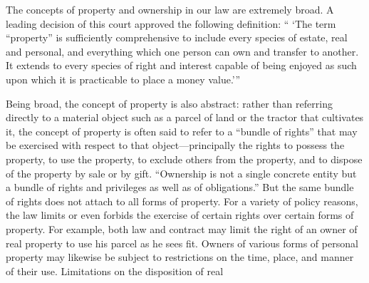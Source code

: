 The concepts of property and ownership in our law are extremely broad. A leading
decision of this court approved the following definition: `` `The term
``property'' is sufficiently comprehensive to include every species of estate,
real and personal, and everything which one person can own and transfer to
another. It extends to every species of right and interest capable of being
enjoyed as such upon which it is practicable to place a money value.'{}''

Being broad, the concept of property is also abstract: rather than referring
directly to a material object such as a parcel of land or the tractor that
cultivates it, the concept of property is often said to refer to a ``bundle of
rights'' that may be exercised with respect to that object---principally the
rights to possess the property, to use the property, to exclude others from the
property, and to dispose of the property by sale or by gift. ``Ownership is not
a single concrete entity but a bundle of rights and privileges as well as of
obligations.'' But the same bundle of rights does not attach to all forms of
property. For a variety of policy reasons, the law limits or even forbids the
exercise of certain rights over certain forms of property. For example, both
law and contract may limit the right of an owner of real property to use his
parcel as he sees fit. Owners of various forms of
personal property may likewise be subject to restrictions on the time, place,
and manner of their use. Limitations on the disposition of real

